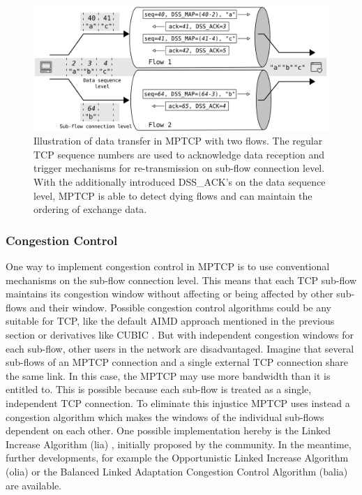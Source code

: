 \begin{figure}
	\begin{center}
		\def\svgwidth{1\textwidth}
		\includegraphics[scale=0.2]{../illustrations/importantConcepts/MPTCPDataTransfer.pdf}  
		\caption[Caption for the list of figures.]{Illustration of data transfer in MPTCP with two flows. The regular TCP sequence numbers are used to acknowledge data reception and trigger mechanisms for re-transmission on sub-flow connection level. With the additionally introduced DSS\_ACK's on the data sequence level, MPTCP is able to detect dying flows and can maintain the ordering of exchange data.}
		\label{fig:MPTCPDataTransfer}
	\end{center}
\end{figure}

\subsubsection{Congestion Control}

One way to implement congestion control in MPTCP is to use conventional mechanisms on the sub-flow connection level. This means that each TCP sub-flow maintains its congestion window without affecting or being affected by other sub-flows and their window. Possible congestion control algorithms could be any suitable for TCP, like the default AIMD approach \cite{rfc5681} mentioned in the previous section or derivatives like CUBIC \cite{rfc8312}. But with independent congestion windows for each sub-flow, other users in the network are disadvantaged. Imagine that several sub-flows of an MPTCP connection and a single external TCP connection share the same link. In this case, the MPTCP may use more bandwidth than it is entitled to.  This is possible because each sub-flow is treated as a single, independent TCP connection. To eliminate this injustice MPTCP uses instead a congestion algorithm which makes the windows of the individual sub-flows dependent on each other. One possible implementation hereby is the Linked Increase Algorithm (lia) \cite{rfc6356}, initially proposed by the community.  In the meantime, further developments, for example the  Opportunistic Linked Increase Algorithm (olia) \cite{khalili-mptcp-congestion-control-05}  or the Balanced Linked Adaptation Congestion Control Algorithm (balia) \cite{walid-mptcp-congestion-control-04} are available.

